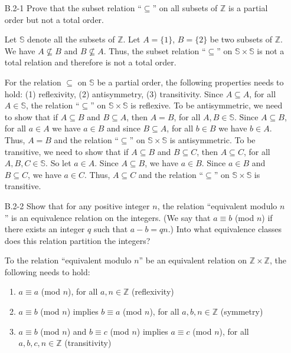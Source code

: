 \begin{enumerate}

\item[B.2{-}1]{Prove that the subset relation ``$\subseteq$'' on all subsets of
$\mathbb{Z}$ is a partial order but not a total order.}

\begin{framed}
Let $\mathbb{S}$ denote all the subsets of $\mathbb{Z}$. Let $A = \{1\}$,
$B = \{2\}$ be two subsets of $\mathbb{Z}$. We have $A \not\subseteq B$ and
$B \not\subseteq A$. Thus, the subset relation ``$\subseteq$'' on
$\mathbb{S} \times \mathbb{S}$ is not a total relation and therefore is not
a total order.

For the relation $\subseteq$ on $\mathbb{S}$ be a partial order, the
following properties needs to hold: (1) reflexivity, (2) antisymmetry,
(3) transitivity. Since $A \subseteq A$, for all $A \in \mathbb{S}$, the
relation ``$\subseteq$'' on $\mathbb{S} \times \mathbb{S}$ is reflexive. To be
antisymmetric, we need to show that if $A \subseteq B$ and $B \subseteq A$, then
$A = B$, for all $A, B \in \mathbb{S}$. Since $A \subseteq B$, for all $a \in A$
we have $a \in B$ and since $B \subseteq A$, for all $b \in B$ we have
$b \in A$.  Thus, $A = B$ and the relation ``$\subseteq$'' on
$\mathbb{S} \times \mathbb{S}$ is antisymmetric. To be transitive, we need to
show that if $A \subseteq B$ and $B \subseteq C$, then $A \subseteq C$, for all
$A, B, C \in \mathbb{S}$. So let $a \in A$.  Since $A \subseteq B$, we have
$a \in B$. Since $a \in B$ and $B \subseteq C$, we have $a \in C$. Thus,
$A \subseteq C$ and the relation ``$\subseteq$'' on
$\mathbb{S} \times \mathbb{S}$ is transitive.
\end{framed}

\item[B.2{-}2]{Show that for any positive integer $n$, the relation ``equivalent
modulo $n$'' is an equivalence relation on the integers. (We say that
$a \equiv b$ (mod $n$) if there exists an integer $q$ such that $a - b = qn$.)
Into what equivalence classes does this relation partition the integers?}

\begin{framed}
To the relation ``equivalent modulo $n$'' be an equivalent relation on
$\mathbb{Z} \times \mathbb{Z}$, the following needs to hold:
\begin{enumerate}
  \item $a \equiv a$ (mod $n$), for all $a, n \in \mathbb{Z}$ (reflexivity)
  \item $a \equiv b$ (mod $n$) implies $b \equiv a$ (mod $n$), for all $a, b, n \in \mathbb{Z}$ (symmetry)
  \item $a \equiv b$ (mod $n$) and $b \equiv c$ (mod $n$) implies $a \equiv c$ (mod $n$), for all $a, b, c, n \in \mathbb{Z}$ (transitivity)
\end{enumerate}


\end{framed}
\end{enumerate}
